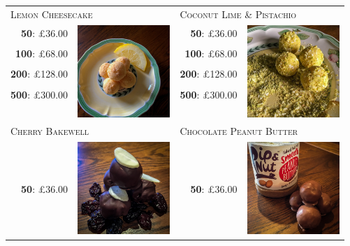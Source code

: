 \documentclass[11pt, english]{article}
\begin{document}
	\begin{table}[h]
	\begin{center}
	\begin{tabular}{r|p{4cm}r|p{4cm}}
		\multicolumn{2}{l}{\textsc{Lemon Cheesecake}} & \multicolumn{2}{l}{\textsc{Coconut Lime \& Pistachio}}\\
		\textbf{50}: \pounds36.00 & \multirow{8}{*}{\includegraphics[width=3.5cm,height=3.5cm]{../Photos_Shop/img_truffle11.jpg}} & \textbf{50}: \pounds36.00 & \multirow{8}{*}{\includegraphics[width=3.5cm,height=3.5cm]{../Photos_Shop/img_truffle2.jpg}}\\
		\textbf{100}: \pounds68.00 & & \textbf{100}: \pounds68.00 & \\
		\textbf{200}: \pounds128.00 & & \textbf{200}: \pounds128.00 & \\
		\textbf{500}: \pounds300.00 & & \textbf{500}: \pounds300.00 & \\
		\multicolumn{4}{l}{}\\
		\multicolumn{4}{l}{}\\
		\multicolumn{4}{l}{}\\
		\multicolumn{4}{l}{}\\
		\multicolumn{2}{l}{\textsc{Cherry Bakewell}} & \multicolumn{2}{l}{\textsc{Chocolate Peanut Butter}}\\
		\textbf{50}: \pounds36.00 & \multirow{5}{*}{\includegraphics[width=3.5cm,height=3.5cm]{../Photos_Shop/img_truffle12.jpg}} & \textbf{50}: \pounds36.00 & \multirow{5}{*}{\includegraphics[width=3.5cm,height=3.5cm]{../Photos_Shop/img_truffle13.jpg}}\\

\end{tabular}
\end{center}
\end{table}
\end{document}
